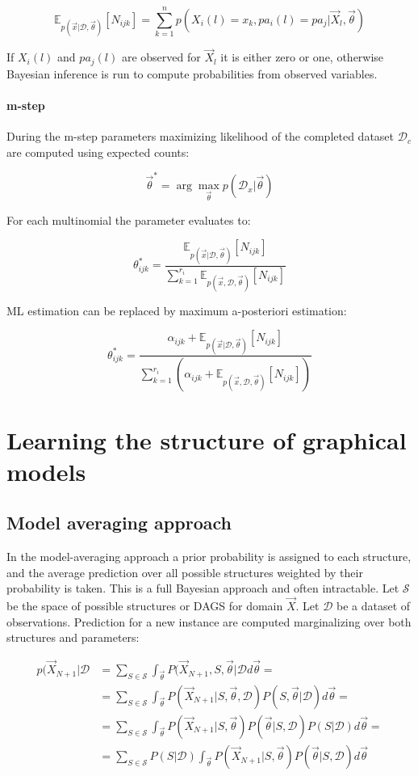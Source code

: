 			$$\mathbb{E}_{p(\vec{x}|\mathcal{D},\vec{\theta})}[N_{ijk}] = \sum\limits_{k=1}^np(X_i(l) = x_k, pa_i(l) = pa_j|\vec{X}_l, \vec{\theta})$$

			If $X_i(l)$ and $pa_j(l)$ are observed for $\vec{X}_l$ it is either zero or one, otherwise Bayesian inference is run to compute probabilities from observed variables.

			\paragraph{m-step}
			During the m-step parameters maximizing likelihood of the completed dataset $\mathcal{D}_c$ are computed using expected counts:

			$$\vec{\theta}^* = \arg\max\limits_{\vec{\theta}}p(\mathcal{D}_x|\vec{\theta})$$

			For each multinomial the parameter evaluates to:

			$$\theta^*_{ijk} = \frac{\mathbb{E}_{p(\vec{x}|\mathcal{D},\vec{\theta})}[N_{ijk}]}{\sum\limits_{k=1}^{r_i}\mathbb{E}_{p(\vec{x}, \mathcal{D},\vec{\theta})}[N_{ijk}]}$$

			ML estimation can be replaced by maximum a-posteriori estimation:

			$$\theta^*_{ijk} = \frac{\alpha_{ijk} + \mathbb{E}_{p(\vec{x}|\mathcal{D},\vec{\theta})}[N_{ijk}]}{\sum\limits_{k=1}^{r_i}(\alpha_{ijk} + \mathbb{E}_{p(\vec{x}, \mathcal{D},\vec{\theta})}[N_{ijk}])}$$

\section{Learning the structure of graphical models}

	\subsection{Model averaging approach}
	In the model-averaging approach a prior probability is assigned to each structure, and the average prediction over all possible structures weighted by their probability is taken.
	This is a full Bayesian approach and often intractable.
	Let $\mathcal{S}$ be the space of possible structures or DAGS for domain $\vec{X}$.
	Let $\mathcal{D}$ be a dataset of observations.
	Prediction for a new instance are computed marginalizing over both structures and parameters:

	\begin{align*}
		p(\vec{X}_{N+1}|\mathcal{D} &= \sum\limits_{S\in\mathcal{S}} \int_{\vec{\theta}} P(\vec{X}_{N+1}, S, \vec{\theta}|\mathcal{D}d\vec{\theta}=\\
																&=\sum\limits_{S\in\mathcal{S}}\int_{\vec{\theta}}P(\vec{X}_{N+1}|S, \vec{\theta}, \mathcal{D})P(S, \vec{\theta}|\mathcal{D})d\vec{\theta}=\\
																&=\sum\limits_{S\in\mathcal{S}}\int_{\vec{\theta}} P(\vec{X}_{N+1}|S, \vec{\theta})P(\vec{\theta}|S, \mathcal{D})P(S|\mathcal{D})d\vec{\theta}=\\
																&=\sum\limits_{S\in\mathcal{S}}P(S|\mathcal{D})\int_{\vec{\theta}}P(\vec{X}_{N+1}|S, \vec{\theta})P(\vec{\theta}|S, \mathcal{D})d\vec{\theta}
	\end{align*}


